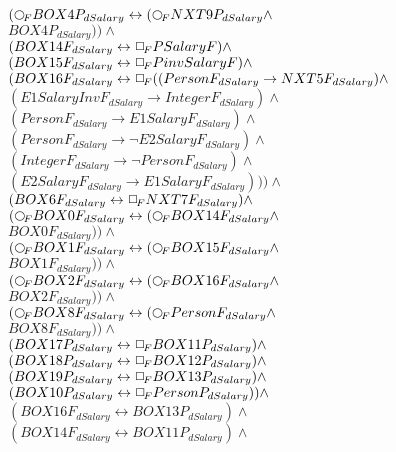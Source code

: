 \documentclass[a4paper,10pt]{article}
\begin{document}
 $ ( \Rnext BOX4P_{dSalary} \leftrightarrow ( \Rnext NXT9P_{dSalary} \land $ \\ 
 $ BOX4P_{dSalary})) \land $ \\ 
 $ (BOX14F_{dSalary} \leftrightarrow  \Box_{\!F} PSalaryF) \land $ \\ 
 $ (BOX15F_{dSalary} \leftrightarrow  \Box_{\!F} PinvSalaryF) \land $ \\ 
 $ (BOX16F_{dSalary} \leftrightarrow  \Box_{\!F} ((PersonF_{dSalary} \rightarrow NXT5F_{dSalary}) \land $ \\ 
 $ (E1SalaryInvF_{dSalary} \rightarrow IntegerF_{dSalary}) \land $ \\ 
 $ (PersonF_{dSalary} \rightarrow E1SalaryF_{dSalary}) \land $ \\ 
 $ (PersonF_{dSalary} \rightarrow  \lnot E2SalaryF_{dSalary}) \land $ \\ 
 $ (IntegerF_{dSalary} \rightarrow  \lnot PersonF_{dSalary}) \land $ \\ 
 $ (E2SalaryF_{dSalary} \rightarrow E1SalaryF_{dSalary}))) \land $ \\ 
 $ (BOX6F_{dSalary} \leftrightarrow  \Box_{\!F} NXT7F_{dSalary}) \land $ \\ 
 $ ( \Rnext BOX0F_{dSalary} \leftrightarrow ( \Rnext BOX14F_{dSalary} \land $ \\ 
 $ BOX0F_{dSalary})) \land $ \\ 
 $ ( \Rnext BOX1F_{dSalary} \leftrightarrow ( \Rnext BOX15F_{dSalary} \land $ \\ 
 $ BOX1F_{dSalary})) \land $ \\ 
 $ ( \Rnext BOX2F_{dSalary} \leftrightarrow ( \Rnext BOX16F_{dSalary} \land $ \\ 
 $ BOX2F_{dSalary})) \land $ \\ 
 $ ( \Rnext BOX8F_{dSalary} \leftrightarrow ( \Rnext PersonF_{dSalary} \land $ \\ 
 $ BOX8F_{dSalary})) \land $ \\ 
 $ (BOX17P_{dSalary} \leftrightarrow  \Box_{\!F} BOX11P_{dSalary}) \land $ \\ 
 $ (BOX18P_{dSalary} \leftrightarrow  \Box_{\!F} BOX12P_{dSalary}) \land $ \\ 
 $ (BOX19P_{dSalary} \leftrightarrow  \Box_{\!F} BOX13P_{dSalary}) \land $ \\ 
 $ (BOX10P_{dSalary} \leftrightarrow  \Box_{\!F} PersonP_{dSalary})) \land $ \\ 
 $ (BOX16F_{dSalary} \leftrightarrow BOX13P_{dSalary}) \land $ \\ 
 $ (BOX14F_{dSalary} \leftrightarrow BOX11P_{dSalary}) \land $ \\ 
\end{document}
